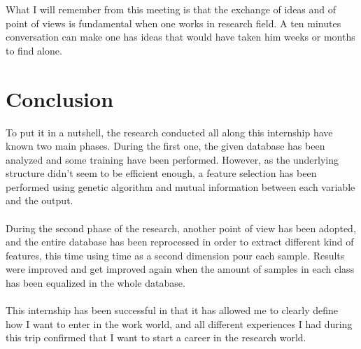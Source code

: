 \documentclass{report}
\begin{document}
	What I will remember from this meeting is that the exchange of ideas and of point of views is fundamental when one works in research field. A ten minutes conversation can make one has ideas that would have taken him weeks or months to find alone.
	
	\chapter{Conclusion}
	
	To put it in a nutshell, the research conducted all along this internship have known two main phases. During the first one, the given database has been analyzed and some training have been performed. However, as the underlying structure didn't seem to be efficient enough, a feature selection has been performed using genetic algorithm and mutual information between each variable and the output.\\\\
	During the second phase of the research, another point of view has been adopted, and the entire database has been reprocessed in order to extract different kind of features, this time using time as a second dimension pour each sample. Results were improved and get improved again when the amount of samples in each class has been equalized in the whole database.\\\\
	This internship has been successful in that it has allowed me to clearly define how I want to enter in the work world, and all different experiences I had during this trip confirmed that I want to start a career in the research world.
	
	
	
	
	
\end{document}
